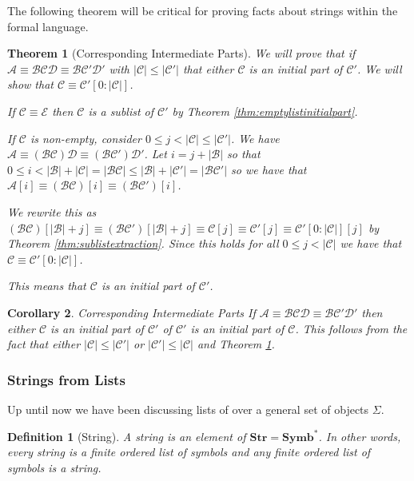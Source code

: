 \documentclass[12pt]{article}
\theoremstyle{break}
\newtheorem{definition}{Definition}[section]
\theoremstyle{break}
\newtheorem{theorem}{Theorem}[section]
\theoremstyle{break}
\newtheorem{corollary}[theorem]{Corollary}
\theoremstyle{break}
\newcommand{\mc}[1]{\mathcal{#1}}
\begin{document}
The following theorem will be critical for proving facts about strings within the formal language.

\begin{theorem}[Corresponding Intermediate Parts]
\label{thm:corrintpart}
We will prove that if $\mc{A}\equiv \mc{B}\mc{C}\mc{D} \equiv \mc{B}\mc{C}'\mc{D}'$ with $|\mc{C}| \le |\mc{C}'|$ that either $\mc{C}$ is an initial part of $\mc{C}'$.
We will show that $\mc{C} \equiv \mc{C}'[0:|\mc{C}|]$.

If $\mc{C}\equiv\mc{E}$ then $\mc{C}$ is a sublist of $\mc{C}'$ by Theorem \ref{thm:emptylistinitialpart}.

If $\mc{C}$ is non-empty, consider $0 \le j < |\mc{C}| \le |\mc{C}'|$.
We have $\mc{A} \equiv (\mc{B}\mc{C})\mc{D} \equiv (\mc{B}\mc{C}')\mc{D}'$.
Let $i = j + |\mc{B}|$ so that $0 \le i < |\mc{B}|+|\mc{C}| =|\mc{B}\mc{C}| \le |\mc{B}|+|\mc{C}'| = |\mc{B}\mc{C}'|$ so we have that $\mc{A}[i] \equiv (\mc{B}\mc{C})[i] \equiv (\mc{B}\mc{C}')[i]$. 

We rewrite this as $(\mc{B}\mc{C})[|\mc{B}|+j] \equiv (\mc{B}\mc{C}')[|\mc{B}|+j] \equiv \mc{C}[j] \equiv \mc{C}'[j] \equiv \mc{C}'[0:|\mc{C}|][j]$ by Theorem \ref{thm:sublistextraction}.
Since this holds for all $0 \le j < |\mc{C}|$ we have that $\mc{C} \equiv \mc{C}'[0:|\mc{C}|]$.

This means that $\mc{C}$ is an initial part of $\mc{C}'$.
\end{theorem}

\begin{corollary}{Corresponding Intermediate Parts}
\label{corr:intpart}
If $\mc{A} \equiv \mc{B}\mc{C}\mc{D} \equiv \mc{B}\mc{C}'\mc{D}'$ then either $\mc{C}$ is an initial part of $\mc{C}'$ of $\mc{C}'$ is an initial part of $\mc{C}$.
This follows from the fact that either $|\mc{C}| \le |\mc{C}'|$ or $|\mc{C}'| \le |\mc{C}|$ and Theorem \ref{thm:corrintpart}.
\end{corollary}

\subsubsection{Strings from Lists}
Up until now we have been discussing lists of over a general set of objects $\Sigma$.

\begin{definition}[String]
A string is an element of $\textbf{Str} = \textbf{Symb}^*$.
In other words, every string is a finite ordered list of symbols and any finite ordered list of symbols is a string.
\end{definition}
\end{document}
